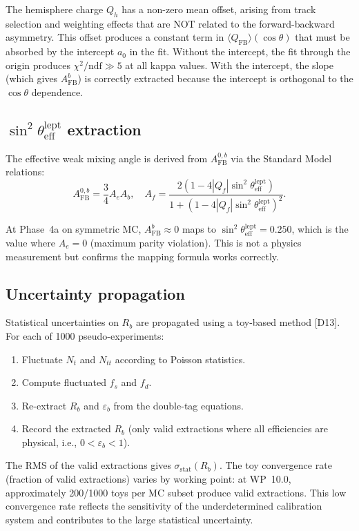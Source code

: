 \documentclass[11pt,a4paper]{article}
\begin{document}
The hemisphere charge $Q_h$ has a non-zero mean offset, arising from track selection
and weighting effects that are NOT related to the forward-backward asymmetry. This
offset produces a constant term in $\langle Q_\mathrm{FB} \rangle(\cos\theta)$ that
must be absorbed by the intercept $a_0$ in the fit. Without the intercept, the fit
through the origin produces $\chi^2/\mathrm{ndf} \gg 5$ at all kappa values. With
the intercept, the slope (which gives $A_\mathrm{FB}^b$) is correctly extracted because
the intercept is orthogonal to the $\cos\theta$ dependence.

\subsection{$\sin^2\theta_\mathrm{eff}^\mathrm{lept}$ extraction}
\label{sec:stat_sin2theta}

The effective weak mixing angle is derived from $A_\mathrm{FB}^{0,b}$ via the Standard
Model relations:
\begin{equation}
A_\mathrm{FB}^{0,b} = \frac{3}{4} A_e A_b, \quad
A_f = \frac{2(1 - 4|Q_f|\sin^2\theta_\mathrm{eff}^\mathrm{lept})}{1 + (1 - 4|Q_f|\sin^2\theta_\mathrm{eff}^\mathrm{lept})^2}.
\label{eq:sin2theta}
\end{equation}

At Phase~4a on symmetric MC, $A_\mathrm{FB}^b \approx 0$ maps to
$\sin^2\theta_\mathrm{eff}^\mathrm{lept} = 0.250$, which is the value where $A_e = 0$
(maximum parity violation). This is not a physics measurement but confirms the
mapping formula works correctly.

\subsection{Uncertainty propagation}
\label{sec:uncertainty_propagation}

Statistical uncertainties on $R_b$ are propagated using a toy-based method [D13].
For each of 1000 pseudo-experiments:
\begin{enumerate}
\item Fluctuate $N_t$ and $N_{tt}$ according to Poisson statistics.
\item Compute fluctuated $f_s$ and $f_d$.
\item Re-extract $R_b$ and $\varepsilon_b$ from the double-tag equations.
\item Record the extracted $R_b$ (only valid extractions where all efficiencies
are physical, i.e., $0 < \varepsilon_b < 1$).
\end{enumerate}
The RMS of the valid extractions gives $\sigma_\mathrm{stat}(R_b)$. The toy
convergence rate (fraction of valid extractions) varies by working point:
at WP~10.0, approximately 200/1000 toys per MC subset produce valid extractions.
This low convergence rate reflects the sensitivity of the underdetermined
calibration system and contributes to the large statistical uncertainty.
\end{document}
